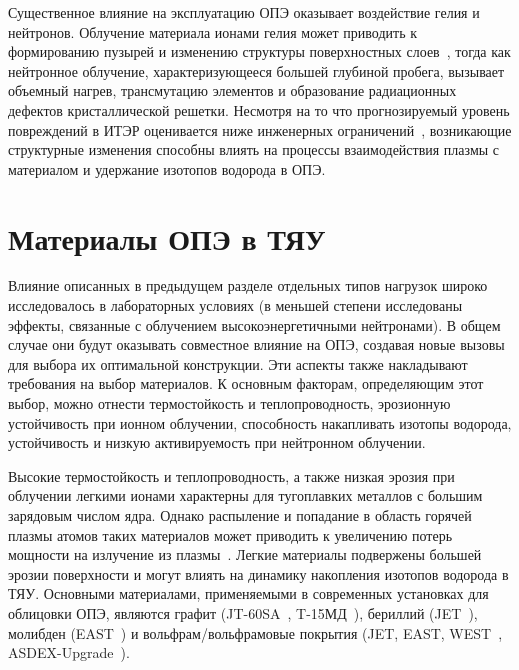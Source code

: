 Существенное влияние на эксплуатацию ОПЭ оказывает воздействие гелия и нейтронов. Облучение материала ионами гелия может приводить к формированию пузырей и изменению структуры поверхностных слоев~\cite{Ueda2018,Kajita2018,Fedorovich2019}, тогда как нейтронное облучение, характеризующееся большей глубиной пробега, вызывает объемный нагрев, трансмутацию элементов и образование радиационных дефектов кристаллической решетки. Несмотря на то что прогнозируемый уровень повреждений в ИТЭР оценивается ниже инженерных ограничений~\cite{Villari2013}, возникающие структурные изменения способны влиять на процессы взаимодействия плазмы с материалом и удержание изотопов водорода в ОПЭ.

\section{Материалы ОПЭ в ТЯУ}\label{sec:ch1/sec2}

Влияние описанных в предыдущем разделе отдельных типов нагрузок широко исследовалось в лабораторных условиях (в меньшей степени исследованы эффекты, связанные с облучением высокоэнергетичными нейтронами). В общем случае они будут оказывать совместное влияние на ОПЭ, создавая новые вызовы для выбора их оптимальной конструкции. Эти аспекты также накладывают требования на выбор материалов. К основным факторам, определяющим этот выбор, можно отнести термостойкость и теплопроводность, эрозионную устойчивость при ионном облучении, способность накапливать изотопы водорода, устойчивость и низкую активируемость при нейтронном облучении.

Высокие термостойкость и теплопроводность, а также низкая эрозия при облучении легкими ионами характерны для тугоплавких металлов с большим зарядовым числом ядра. Однако распыление и попадание в область горячей плазмы атомов таких материалов может приводить к увеличению потерь мощности на излучение из плазмы~\cite{Ptterich2019}. Легкие материалы подвержены большей эрозии поверхности и могут влиять на динамику накопления изотопов водорода в ТЯУ. Основными материалами, применяемыми в современных установках для облицовки ОПЭ, являются графит (JT-60SA~\cite{Shirai2024}, T-15МД~\cite{Velikhov2024}), бериллий (JET~\cite{Maggi2024,Kappatou2025}), молибден (EAST~\cite{Gong2024}) и вольфрам/вольфрамовые покрытия (JET, EAST, WEST~\cite{Dumont2026}, ASDEX-Upgrade~\cite{Rohde2009}).

